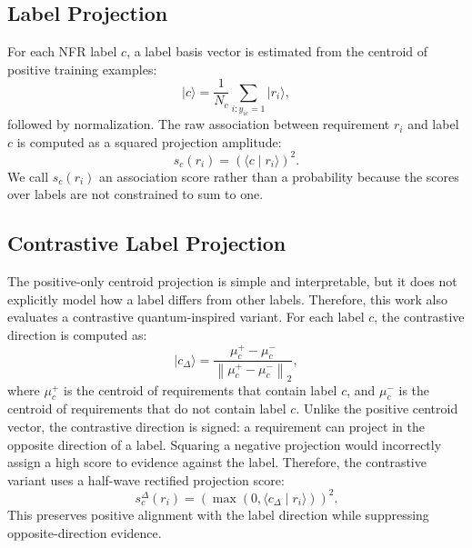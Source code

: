 \documentclass[runningheads]{llncs}
\begin{document}
\subsection{Label Projection}
For each NFR label $c$, a label basis vector is estimated from the centroid of
positive training examples:
\begin{equation}
    \lvert c \rangle = \frac{1}{N_c}\sum_{i:y_{ic}=1}\lvert r_i \rangle,
\end{equation}
followed by normalization. The raw association between requirement $r_i$ and
label $c$ is computed as a squared projection amplitude:
\begin{equation}
    s_c(r_i) = \left(\langle c \mid r_i \rangle\right)^2.
\end{equation}
We call $s_c(r_i)$ an association score rather than a probability because the
scores over labels are not constrained to sum to one.

\subsection{Contrastive Label Projection}
The positive-only centroid projection is simple and interpretable, but it does
not explicitly model how a label differs from other labels. Therefore, this
work also evaluates a contrastive quantum-inspired variant. For each label $c$,
the contrastive direction is computed as:
\begin{equation}
    \lvert c_{\Delta} \rangle =
    \frac{\mu_c^{+} - \mu_c^{-}}
    {\left\|\mu_c^{+} - \mu_c^{-}\right\|_2},
\end{equation}
where $\mu_c^{+}$ is the centroid of requirements that contain label $c$, and
$\mu_c^{-}$ is the centroid of requirements that do not contain label $c$.
Unlike the positive centroid vector, the contrastive direction is signed: a
requirement can project in the opposite direction of a label. Squaring a
negative projection would incorrectly assign a high score to evidence against
the label. Therefore, the contrastive variant uses a half-wave rectified
projection score:
\begin{equation}
    s^{\Delta}_c(r_i) =
    \left(\max(0,\langle c_{\Delta}\mid r_i\rangle)\right)^2.
\end{equation}
This preserves positive alignment with the label direction while suppressing
opposite-direction evidence.
\end{document}
